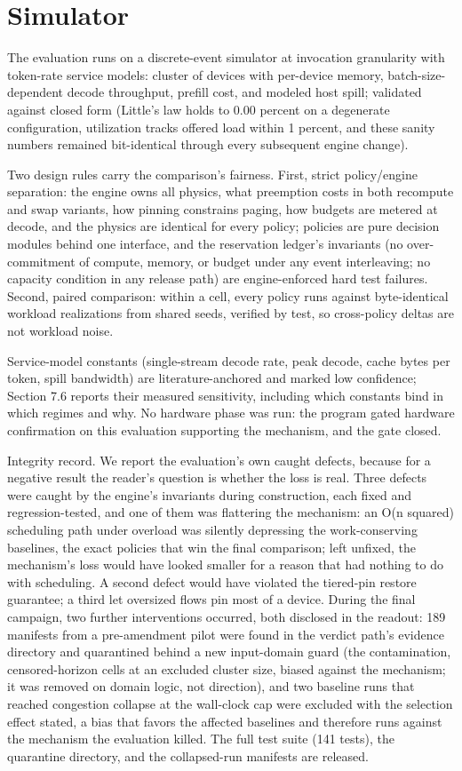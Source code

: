 \section{Simulator}

The evaluation runs on a discrete-event simulator at invocation granularity
with token-rate service models: cluster of devices with per-device memory,
batch-size-dependent decode throughput, prefill cost, and modeled host
spill; validated against closed form (Little's law holds to 0.00 percent on
a degenerate configuration, utilization tracks offered load within 1
percent, and these sanity numbers remained bit-identical through every
subsequent engine change).

Two design rules carry the comparison's fairness. First, strict
policy/engine separation: the engine owns all physics, what preemption
costs in both recompute and swap variants, how pinning constrains paging,
how budgets are metered at decode, and the physics are identical for every
policy; policies are pure decision modules behind one interface, and the
reservation ledger's invariants (no over-commitment of compute, memory, or
budget under any event interleaving; no capacity condition in any release
path) are engine-enforced hard test failures. Second, paired comparison:
within a cell, every policy runs against byte-identical workload
realizations from shared seeds, verified by test, so cross-policy deltas
are not workload noise.

Service-model constants (single-stream decode rate, peak decode, cache
bytes per token, spill bandwidth) are literature-anchored and marked low
confidence; Section 7.6 reports their measured sensitivity, including which
constants bind in which regimes and why. No hardware phase was run: the
program gated hardware confirmation on this evaluation supporting the
mechanism, and the gate closed.

Integrity record. We report the evaluation's own caught defects, because
for a negative result the reader's question is whether the loss is real.
Three defects were caught by the engine's invariants during construction,
each fixed and regression-tested, and one of them was flattering the
mechanism: an O(n squared) scheduling path under overload was silently
depressing the work-conserving baselines, the exact policies that win the
final comparison; left unfixed, the mechanism's loss would have looked
smaller for a reason that had nothing to do with scheduling. A second
defect would have violated the tiered-pin restore guarantee; a third let
oversized flows pin most of a device. During the final campaign, two
further interventions occurred, both disclosed in the readout: 189
manifests from a pre-amendment pilot were found in the verdict path's
evidence directory and quarantined behind a new input-domain guard (the
contamination, censored-horizon cells at an excluded cluster size, biased
against the mechanism; it was removed on domain logic, not direction), and
two baseline runs that reached congestion collapse at the wall-clock cap
were excluded with the selection effect stated, a bias that favors the
affected baselines and therefore runs against the mechanism the evaluation
killed. The full test suite (141 tests), the quarantine directory, and the
collapsed-run manifests are released.
